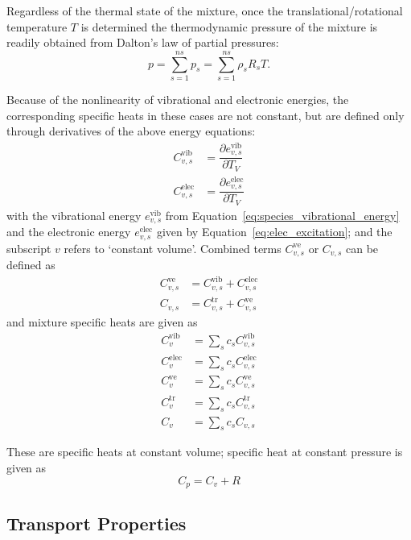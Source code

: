\documentclass[10pt]{article}
\newcommand{\diff}[2] {\dfrac{\partial #1 }{\partial #2}}
\begin{document}
Regardless of the thermal state of the mixture, once the translational/rotational temperature $T$ is determined the thermodynamic pressure of the mixture is readily obtained from Dalton's law of partial pressures:
\begin{equation}
 p = \sum_{s=1}^{ns} p_s = \sum_{s=1}^{ns} \rho_s R_s T .
 \label{eq:p_eq_state}
\end{equation}


Because of the nonlinearity of vibrational and electronic energies,
the corresponding specific heats in these cases are not constant, but
are defined only through derivatives of the above energy equations:
\begin{align*}
C^{\text{vib}}_{v,s} &= \diff{e^{\text{vib}}_{v,s}}{T_V} \\
C^{\text{elec}}_{v,s} &= \diff{e^{\text{elec}}_{v,s}}{T_V}
\end{align*}
with the vibrational energy $e^{\text{vib}}_{v,s}$ from
Equation~\eqref{eq:species_vibrational_energy} and the 
electronic energy $e^{\text{elec}}_{v,s}$ given by
Equation~\eqref{eq:elec_excitation}; and the subscript $v$ refers to `constant volume'. 
%
Combined terms $C^{\text{ve}}_{v,s}$ or $C_{v,s}$ can be defined as
\begin{align*}
  C^{\text{ve}}_{v,s} &= C^{\text{vib}}_{v,s} + C^{\text{elec}}_{v,s} \\
  C_{v,s} &= C^{\text{tr}}_{v,s} + C^{\text{ve}}_{v,s}
\end{align*}
%
and mixture specific heats are given as
\begin{equation}
\begin{split}\label{eq:Cv}
  C^{\text{vib}}_{v} &= \sum_s c_s     C^{\text{vib}}_{v,s} \\
  C^{\text{elec}}_{v} &= \sum_s c_s    C^{\text{elec}}_{v,s} \\
  C^{\text{ve}}_{v} &=  \sum_s c_s    C^{\text{ve}}_{v,s} \\
  C^{\text{tr}}_{v} &= \sum_s c_s    C^{\text{tr}}_{v,s} \\
  C_{v} &= \sum_s c_s    C_{v,s}
\end{split}
\end{equation}

These are specific heats at constant volume; specific heat at constant
pressure is given as
\begin{equation}\label{eq:Cp}
C_p = C_v + R
\end{equation}

\subsection{Transport Properties}
\end{document}
